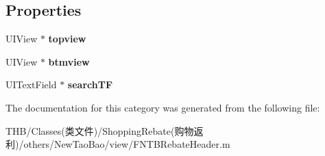 \subsection*{Properties}
\begin{DoxyCompactItemize}
\item 
\mbox{\label{category_f_n_t_b_rebate_header_07_08_a0f9270de8cd3f0460b3e45bce55e0af3}} 
U\+I\+View $\ast$ {\bfseries topview}
\item 
\mbox{\label{category_f_n_t_b_rebate_header_07_08_ac98555fc32579d07b9fcf3f5b2b3a5b5}} 
U\+I\+View $\ast$ {\bfseries btmview}
\item 
\mbox{\label{category_f_n_t_b_rebate_header_07_08_a121105505dcb67ab06a7d2d70547c65b}} 
U\+I\+Text\+Field $\ast$ {\bfseries search\+TF}
\end{DoxyCompactItemize}


The documentation for this category was generated from the following file\+:\begin{DoxyCompactItemize}
\item 
T\+H\+B/\+Classes(类文件)/\+Shopping\+Rebate(购物返利)/others/\+New\+Tao\+Bao/view/F\+N\+T\+B\+Rebate\+Header.\+m\end{DoxyCompactItemize}
